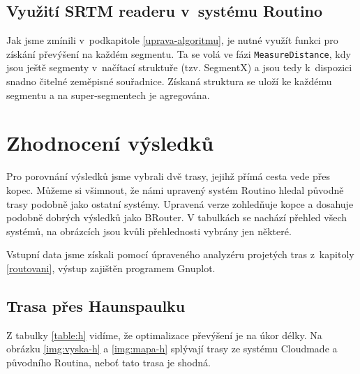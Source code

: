 \documentclass[thesis=B,czech]{FITthesis}[2012/06/26]
\begin{document}
\section{Využití SRTM readeru v~systému Routino}

Jak jsme zmínili v~podkapitole \ref{uprava-algoritmu}, je nutné využít funkci pro získání převýšení na každém segmentu. Ta se volá ve fázi \verb|MeasureDistance|, kdy jsou ještě segmenty v~načítací struktuře (tzv. SegmentX) a jsou tedy k~dispozici snadno čitelné zeměpisné souřadnice. Získaná struktura se uloží ke každému segmentu a na super-segmentech je agregována.





















\chapter{Zhodnocení výsledků}

Pro porovnání výsledků jsme vybrali dvě trasy, jejihž přímá cesta vede přes kopec. Můžeme si všimnout, že námi upravený systém Routino hledal původně trasy podobně jako ostatní systémy. Upravená verze zohledňuje kopce a dosahuje podobně dobrých výsledků jako BRouter. V tabulkách se nachází přehled všech systémů, na  obrázcích jsou kvůli přehlednosti vybrány jen některé. 

Vstupní data jsme získali pomocí úpraveného analyzéru projetých tras z~kapitoly \ref{routovani}, výstup zajištěn programem Gnuplot.

\section{Trasa přes Haunspaulku}
Z tabulky \ref{table:h} vidíme, že optimalizace převýšení je na úkor délky. Na obrázku \ref{img:vyska-h} a \ref{img:mapa-h} splývají trasy ze systému Cloudmade a původního Routina, neboť tato trasa je shodná. 
\end{document}
